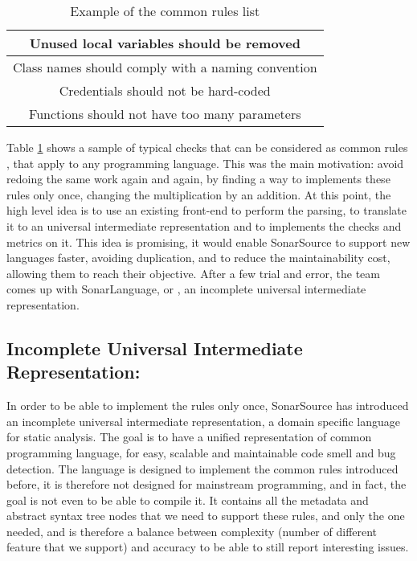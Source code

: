 \begin{table}[h]
\centering
\caption{Example of the common rules list}
\label{table:common_rules}
	\begin{tabular}{|c|}
		\hline
		Unused local variables should be removed  \\ \hline
		Class names should comply with a naming convention \\ \hline
		Credentials should not be hard-coded \\ \hline
		Functions should not have too many parameters \\ \hline
	\end{tabular}
\end{table}

Table \ref{table:common_rules} shows a sample of typical checks that can be considered as common rules \cite{JiraSonarSource:2019:Online} , that apply to any programming language.
This was the main motivation: avoid redoing the same work again and again, by finding a way to implements these rules only once, changing the multiplication by an addition.
At this point, the high level idea is to use an existing front-end to perform the parsing, to translate it to an universal intermediate representation and to implements the checks and metrics on it.
This idea is promising, it would enable SonarSource to support new languages faster, avoiding duplication, and to reduce the maintainability cost, allowing them to reach their objective.
After a few trial and error, the team comes up with SonarLanguage, or \slang{}, an incomplete universal intermediate representation. 


\subsection{Incomplete Universal Intermediate Representation: \slang{}}
\label{subsec:slang}

In order to be able to implement the rules only once, SonarSource has introduced an incomplete universal intermediate representation, a domain specific language for static analysis. 
The goal is to have a unified representation of common programming language, for easy, scalable and maintainable code smell and bug detection. 
The language is designed to implement the common rules introduced before, it is therefore not designed for mainstream programming, and in fact, the goal is not even to be able to compile it.
It contains all the metadata and abstract syntax tree nodes that we need to support these rules, and only the one needed, and is therefore a balance between complexity (number of different feature that we support) and accuracy to be able to still report interesting issues. 

